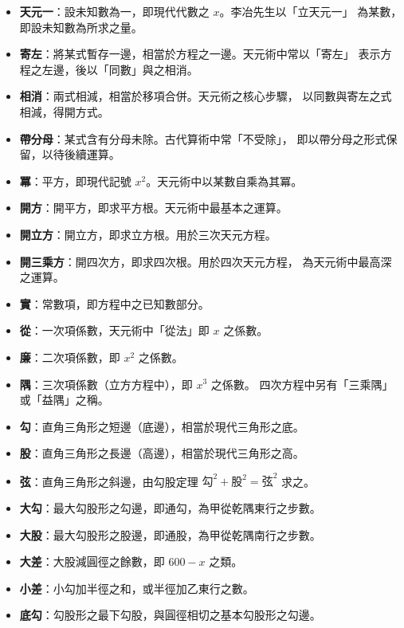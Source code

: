 \documentclass[11pt,a4paper]{article}
\begin{document}
\begin{itemize}
  \item \textbf{天元一}：設未知數為一，即現代代數之 $x$。李冶先生以「立天元一」
  為某數，即設未知數為所求之量。
  
  \item \textbf{寄左}：將某式暫存一邊，相當於方程之一邊。天元術中常以「寄左」
  表示方程之左邊，後以「同數」與之相消。
  
  \item \textbf{相消}：兩式相減，相當於移項合併。天元術之核心步驟，
  以同數與寄左之式相減，得開方式。
  
  \item \textbf{帶分母}：某式含有分母未除。古代算術中常「不受除」，
  即以帶分母之形式保留，以待後續運算。
  
  \item \textbf{冪}：平方，即現代記號 $x^2$。天元術中以某數自乘為其冪。
  
  \item \textbf{開方}：開平方，即求平方根。天元術中最基本之運算。
  
  \item \textbf{開立方}：開立方，即求立方根。用於三次天元方程。
  
  \item \textbf{開三乘方}：開四次方，即求四次根。用於四次天元方程，
  為天元術中最高深之運算。
  
  \item \textbf{實}：常數項，即方程中之已知數部分。
  
  \item \textbf{從}：一次項係數，天元術中「從法」即 $x$ 之係數。
  
  \item \textbf{廉}：二次項係數，即 $x^2$ 之係數。
  
  \item \textbf{隅}：三次項係數（立方方程中），即 $x^3$ 之係數。
  四次方程中另有「三乘隅」或「益隅」之稱。
  
  \item \textbf{勾}：直角三角形之短邊（底邊），相當於現代三角形之底。
  
  \item \textbf{股}：直角三角形之長邊（高邊），相當於現代三角形之高。
  
  \item \textbf{弦}：直角三角形之斜邊，由勾股定理 $\text{勾}^2 + \text{股}^2 = \text{弦}^2$ 求之。
  
  \item \textbf{大勾}：最大勾股形之勾邊，即通勾，為甲從乾隅東行之步數。
  
  \item \textbf{大股}：最大勾股形之股邊，即通股，為甲從乾隅南行之步數。
  
  \item \textbf{大差}：大股減圓徑之餘數，即 $600 - x$ 之類。
  
  \item \textbf{小差}：小勾加半徑之和，或半徑加乙東行之數。
  
  \item \textbf{底勾}：勾股形之最下勾股，與圓徑相切之基本勾股形之勾邊。
\end{itemize}
\end{document}
